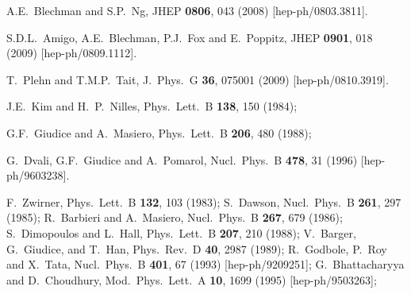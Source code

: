 \documentclass[11pt]{article}
\begin{document}
\begin{thebibliography}{999}
  A.E.~Blechman and S.P.~Ng,
  JHEP {\bf 0806}, 043 (2008)  
  [hep-ph/0803.3811].

S.D.L.~Amigo, A.E.~Blechman, P.J.~Fox and E.~Poppitz,
  JHEP {\bf 0901}, 018 (2009)
  [hep-ph/0809.1112].

  T.~Plehn and T.M.P.~Tait,
  J.\ Phys.\ G {\bf 36}, 075001 (2009)
  [hep-ph/0810.3919].

J.E.~Kim and H.~P.~Nilles, 
  Phys.\ Lett.\ B {\bf 138}, 150 (1984);

G.F.~Giudice and A.~Masiero, 
  Phys.\ Lett.\ B {\bf 206}, 480 (1988);

G.~Dvali, G.F.~Giudice and A.~Pomarol,
  Nucl.\ Phys.\ B {\bf 478}, 31 (1996)
  [hep-ph/9603238].

F.~Zwirner, 
  Phys.\ Lett.\ B {\bf 132}, 103 (1983);
S.~Dawson,
  Nucl.\ Phys.\ B {\bf 261}, 297 (1985);
R.~Barbieri and A.~Masiero, 
  Nucl.\ Phys.\ B {\bf 267}, 679 (1986);
S.~Dimopoulos and L.~Hall, 
  Phys.\ Lett.\ B {\bf 207}, 210 (1988);
V.~Barger, G.~Giudice, and T.~Han, 
  Phys.\ Rev.\ D {\bf 40}, 2987 (1989);
R.~Godbole, P.~Roy and X.~Tata, 
  Nucl.\ Phys.\ B {\bf 401}, 67 (1993)
  [hep-ph/9209251];
G.~Bhattacharyya and D.~Choudhury, 
  Mod.\ Phys.\ Lett.\ A {\bf 10}, 1699 (1995)
  [hep-ph/9503263];


\end{thebibliography}
\end{document}
